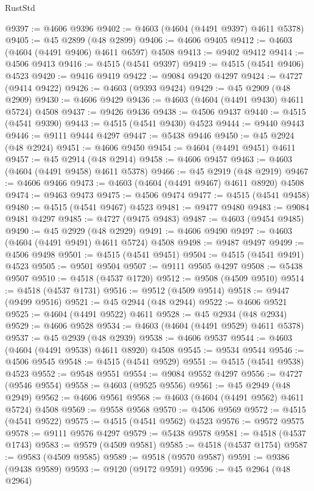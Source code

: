 \begin{lexlean}{RustStd}
\begin{coremodule}
@9397 := @4606 @9396
@9402 := @4603 (@4604 (@4491 @9397) @4611 @5378)
@9405 := @45 @2899 (@48 @2899)
@9406 := @4606 @9405
@9412 := @4603 (@4604 (@4491 @9406) @4611 @6597) @4508
@9413 := @9402 @9412
@9414 := @4506 @9413
@9416 := @4515 (@4541 @9397)
@9419 := @4515 (@4541 @9406) @4523
@9420 := @9416 @9419
@9422 := @9084 @9420 @4297
@9424 := @4727 (@9414 @9422)
@9426 := @4603 (@9393 @9424)
@9429 := @45 @2909 (@48 @2909)
@9430 := @4606 @9429
@9436 := @4603 (@4604 (@4491 @9430) @4611 @5724) @4508
@9437 := @9426 @9436
@9438 := @4506 @9437
@9440 := @4515 (@4541 @9390)
@9443 := @4515 (@4541 @9430) @4523
@9444 := @9440 @9443
@9446 := @9111 @9444 @4297
@9447 := @5438 @9446
@9450 := @45 @2924 (@48 @2924)
@9451 := @4606 @9450
@9454 := @4604 (@4491 @9451) @4611
@9457 := @45 @2914 (@48 @2914)
@9458 := @4606 @9457
@9463 := @4603 (@4604 (@4491 @9458) @4611 @5378)
@9466 := @45 @2919 (@48 @2919)
@9467 := @4606 @9466
@9473 := @4603 (@4604 (@4491 @9467) @4611 @8920) @4508
@9474 := @9463 @9473
@9475 := @4506 @9474
@9477 := @4515 (@4541 @9458)
@9480 := @4515 (@4541 @9467) @4523
@9481 := @9477 @9480
@9483 := @9084 @9481 @4297
@9485 := @4727 (@9475 @9483)
@9487 := @4603 (@9454 @9485)
@9490 := @45 @2929 (@48 @2929)
@9491 := @4606 @9490
@9497 := @4603 (@4604 (@4491 @9491) @4611 @5724) @4508
@9498 := @9487 @9497
@9499 := @4506 @9498
@9501 := @4515 (@4541 @9451)
@9504 := @4515 (@4541 @9491) @4523
@9505 := @9501 @9504
@9507 := @9111 @9505 @4297
@9508 := @5438 @9507
@9510 := @4518 (@4537 @1720)
@9512 := @9508 (@4509 @9510)
@9514 := @4518 (@4537 @1731)
@9516 := @9512 (@4509 @9514)
@9518 := @9447 (@9499 @9516)
@9521 := @45 @2944 (@48 @2944)
@9522 := @4606 @9521
@9525 := @4604 (@4491 @9522) @4611
@9528 := @45 @2934 (@48 @2934)
@9529 := @4606 @9528
@9534 := @4603 (@4604 (@4491 @9529) @4611 @5378)
@9537 := @45 @2939 (@48 @2939)
@9538 := @4606 @9537
@9544 := @4603 (@4604 (@4491 @9538) @4611 @8920) @4508
@9545 := @9534 @9544
@9546 := @4506 @9545
@9548 := @4515 (@4541 @9529)
@9551 := @4515 (@4541 @9538) @4523
@9552 := @9548 @9551
@9554 := @9084 @9552 @4297
@9556 := @4727 (@9546 @9554)
@9558 := @4603 (@9525 @9556)
@9561 := @45 @2949 (@48 @2949)
@9562 := @4606 @9561
@9568 := @4603 (@4604 (@4491 @9562) @4611 @5724) @4508
@9569 := @9558 @9568
@9570 := @4506 @9569
@9572 := @4515 (@4541 @9522)
@9575 := @4515 (@4541 @9562) @4523
@9576 := @9572 @9575
@9578 := @9111 @9576 @4297
@9579 := @5438 @9578
@9581 := @4518 (@4537 @1743)
@9583 := @9579 (@4509 @9581)
@9585 := @4518 (@4537 @1754)
@9587 := @9583 (@4509 @9585)
@9589 := @9518 (@9570 @9587)
@9591 := @9386 (@9438 @9589)
@9593 := @9120 (@9172 @9591)
@9596 := @45 @2964 (@48 @2964)

\end{coremodule}
\end{lexlean}
